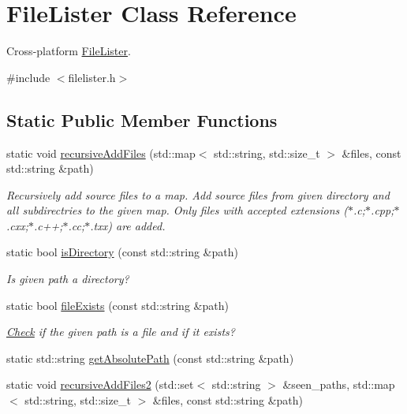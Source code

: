 \hypertarget{class_file_lister}{\section{File\-Lister Class Reference}
\label{class_file_lister}
}


Cross-\/platform \hyperlink{class_file_lister}{File\-Lister}.  




{\ttfamily \#include $<$filelister.\-h$>$}

\subsection*{Static Public Member Functions}
\begin{DoxyCompactItemize}
\item 
static void \hyperlink{class_file_lister_aa728ecb07266786854ec816ea4b96b7b}{recursive\-Add\-Files} (std\-::map$<$ std\-::string, std\-::size\-\_\-t $>$ \&files, const std\-::string \&path)
\begin{DoxyCompactList}\small\item\em Recursively add source files to a map. Add source files from given directory and all subdirectries to the given map. Only files with accepted extensions ($\ast$.c;$\ast$.cpp;$\ast$.cxx;$\ast$.c++;$\ast$.cc;$\ast$.txx) are added. \end{DoxyCompactList}\item 
static bool \hyperlink{class_file_lister_af88b22cd718521d7d26deb5898c6a14f}{is\-Directory} (const std\-::string \&path)
\begin{DoxyCompactList}\small\item\em Is given path a directory? \end{DoxyCompactList}\item 
static bool \hyperlink{class_file_lister_a13ce906aa6f5d1c627ddbdebc9831ee5}{file\-Exists} (const std\-::string \&path)
\begin{DoxyCompactList}\small\item\em \hyperlink{class_check}{Check} if the given path is a file and if it exists? \end{DoxyCompactList}\item 
static std\-::string \hyperlink{class_file_lister_a466807f8ef2c0dd41674d5a407ab1245}{get\-Absolute\-Path} (const std\-::string \&path)
\item 
static void \hyperlink{class_file_lister_a96314741dc696e8f0e424010dc848040}{recursive\-Add\-Files2} (std\-::set$<$ std\-::string $>$ \&seen\-\_\-paths, std\-::map$<$ std\-::string, std\-::size\-\_\-t $>$ \&files, const std\-::string \&path)
\end{DoxyCompactItemize}


